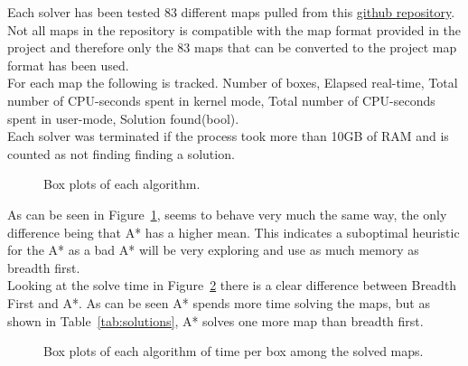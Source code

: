 \documentclass[../../main.tex]{subfiles}
\begin{document}
Each solver has been tested 83 different maps pulled from this
\href{https://github.com/bravegnu/python-sokoban}{github repository}.
Not all maps in the repository is compatible with the map format provided in the project
and therefore only the 83 maps that can be converted to the project map format has been used.\\

For each map the following is tracked. Number of boxes, Elapsed real-time,
Total number of CPU-seconds spent in kernel mode, Total number of CPU-seconds spent in user-mode,
Solution found(bool).\\

Each solver was terminated if the process took more than 10GB of RAM and is counted as not finding
finding a solution.


\begin{figure}[h]
	\centering
	\caption{Box plots of each algorithm.}%
	\label{fig:boxplots}
\end{figure}

As can be seen in Figure~\ref{fig:boxplots}, seems to behave very much the same way, the only
difference being that A* has a higher mean. This indicates a suboptimal heuristic for the A*
as a bad A* will be very exploring and use as much memory as breadth first.\\

Looking at the solve time in Figure~\ref{fig:boxplots_time} there is a clear difference between
Breadth First and A*. As can be seen A* spends more time solving the maps, but as shown in
Table~\ref{tab:solutions}, A* solves one more map than breadth first.\\

\begin{figure}[h]
	\centering

	\caption{Box plots of each algorithm of time per box among the solved maps.}%
	\label{fig:boxplots_time}
\end{figure}
\end{document}
